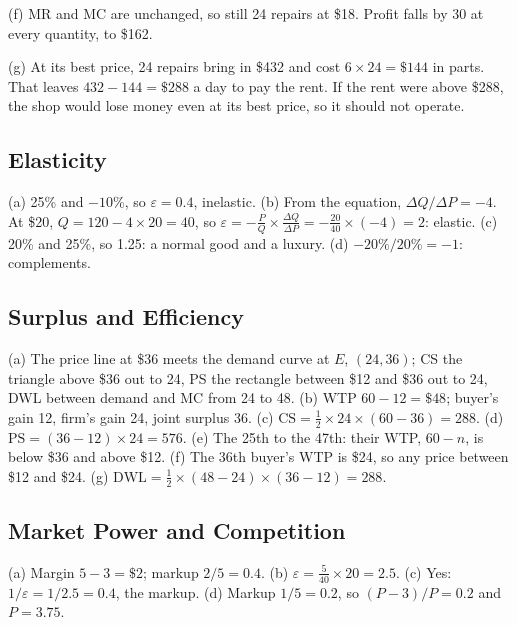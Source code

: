 \documentclass[11pt]{article}
\begin{document}
(f) MR and MC are unchanged, so still 24 repairs at \$18. Profit falls by 30 at every quantity, to \$162.

(g) At its best price, 24 repairs bring in \$432 and cost $6 \times 24 = \$144$ in parts. That leaves $432 - 144 = \$288$ a day to pay the rent. If the rent were above \$288, the shop would lose money even at its best price, so it should not operate.

\subsection{Elasticity}

(a) 25\% and $-10\%$, so $\varepsilon = 0.4$, inelastic. (b) From the equation, $\Delta Q / \Delta P = -4$. At \$20, $Q = 120 - 4 \times 20 = 40$, so $\varepsilon = -\tfrac{P}{Q} \times \tfrac{\Delta Q}{\Delta P} = -\tfrac{20}{40} \times (-4) = 2$: elastic. (c) 20\% and 25\%, so 1.25: a normal good and a luxury. (d) $-20\%/20\% = -1$: complements.

\subsection{Surplus and Efficiency}

(a) The price line at \$36 meets the demand curve at $E$, $(24, 36)$; CS the triangle above \$36 out to 24, PS the rectangle between \$12 and \$36 out to 24, DWL between demand and MC from 24 to 48. (b) WTP $60 - 12 = \$48$; buyer's gain 12, firm's gain 24, joint surplus 36. (c) $\text{CS} = \tfrac{1}{2} \times 24 \times (60 - 36) = 288$. (d) $\text{PS} = (36 - 12) \times 24 = 576$. (e) The 25th to the 47th: their WTP, $60 - n$, is below \$36 and above \$12. (f) The 36th buyer's WTP is \$24, so any price between \$12 and \$24. (g) $\text{DWL} = \tfrac{1}{2} \times (48 - 24) \times (36 - 12) = 288$.

\subsection{Market Power and Competition}
(a) Margin $5 - 3 = \$2$; markup $2/5 = 0.4$. (b) $\varepsilon = \frac{5}{40} \times 20 = 2.5$. (c) Yes: $1/\varepsilon = 1/2.5 = 0.4$, the markup. (d) Markup $1/5 = 0.2$, so $(P - 3)/P = 0.2$ and $P = 3.75$.
\end{document}
